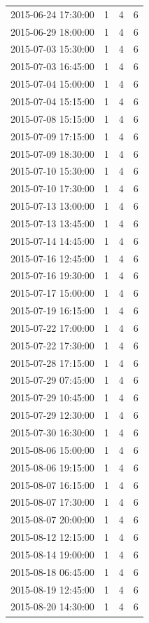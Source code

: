 \begin{tabular}{lrrr}
2015-06-24 17:30:00 & 1 & 4 & 6 \\
2015-06-29 18:00:00 & 1 & 4 & 6 \\
2015-07-03 15:30:00 & 1 & 4 & 6 \\
2015-07-03 16:45:00 & 1 & 4 & 6 \\
2015-07-04 15:00:00 & 1 & 4 & 6 \\
2015-07-04 15:15:00 & 1 & 4 & 6 \\
2015-07-08 15:15:00 & 1 & 4 & 6 \\
2015-07-09 17:15:00 & 1 & 4 & 6 \\
2015-07-09 18:30:00 & 1 & 4 & 6 \\
2015-07-10 15:30:00 & 1 & 4 & 6 \\
2015-07-10 17:30:00 & 1 & 4 & 6 \\
2015-07-13 13:00:00 & 1 & 4 & 6 \\
2015-07-13 13:45:00 & 1 & 4 & 6 \\
2015-07-14 14:45:00 & 1 & 4 & 6 \\
2015-07-16 12:45:00 & 1 & 4 & 6 \\
2015-07-16 19:30:00 & 1 & 4 & 6 \\
2015-07-17 15:00:00 & 1 & 4 & 6 \\
2015-07-19 16:15:00 & 1 & 4 & 6 \\
2015-07-22 17:00:00 & 1 & 4 & 6 \\
2015-07-22 17:30:00 & 1 & 4 & 6 \\
2015-07-28 17:15:00 & 1 & 4 & 6 \\
2015-07-29 07:45:00 & 1 & 4 & 6 \\
2015-07-29 10:45:00 & 1 & 4 & 6 \\
2015-07-29 12:30:00 & 1 & 4 & 6 \\
2015-07-30 16:30:00 & 1 & 4 & 6 \\
2015-08-06 15:00:00 & 1 & 4 & 6 \\
2015-08-06 19:15:00 & 1 & 4 & 6 \\
2015-08-07 16:15:00 & 1 & 4 & 6 \\
2015-08-07 17:30:00 & 1 & 4 & 6 \\
2015-08-07 20:00:00 & 1 & 4 & 6 \\
2015-08-12 12:15:00 & 1 & 4 & 6 \\
2015-08-14 19:00:00 & 1 & 4 & 6 \\
2015-08-18 06:45:00 & 1 & 4 & 6 \\
2015-08-19 12:45:00 & 1 & 4 & 6 \\
2015-08-20 14:30:00 & 1 & 4 & 6 \\

\end{tabular}
